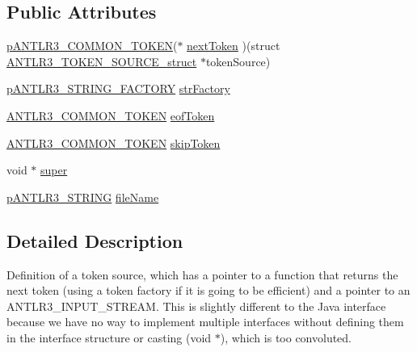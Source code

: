 \subsection*{Public Attributes}
\begin{DoxyCompactItemize}
\item 
\hyperlink{antlr3interfaces_8h_adaa6df9cbf0cd7ab37fd545520ff299b}{p\-A\-N\-T\-L\-R3\-\_\-\-C\-O\-M\-M\-O\-N\-\_\-\-T\-O\-K\-E\-N}($\ast$ \hyperlink{struct_a_n_t_l_r3___t_o_k_e_n___s_o_u_r_c_e__struct_ac1e745731ff025ccd806f6becfb4c4ea}{next\-Token} )(struct \hyperlink{struct_a_n_t_l_r3___t_o_k_e_n___s_o_u_r_c_e__struct}{A\-N\-T\-L\-R3\-\_\-\-T\-O\-K\-E\-N\-\_\-\-S\-O\-U\-R\-C\-E\-\_\-struct} $\ast$token\-Source)
\item 
\hyperlink{antlr3interfaces_8h_a499a87287d582de04cf736f342b20692}{p\-A\-N\-T\-L\-R3\-\_\-\-S\-T\-R\-I\-N\-G\-\_\-\-F\-A\-C\-T\-O\-R\-Y} \hyperlink{struct_a_n_t_l_r3___t_o_k_e_n___s_o_u_r_c_e__struct_ab65d5aa5431af0423d02ee9777417bd9}{str\-Factory}
\item 
\hyperlink{antlr3commontoken_8h_ab35c5fc3921ac6bfa1dbb31681aa9a0f}{A\-N\-T\-L\-R3\-\_\-\-C\-O\-M\-M\-O\-N\-\_\-\-T\-O\-K\-E\-N} \hyperlink{struct_a_n_t_l_r3___t_o_k_e_n___s_o_u_r_c_e__struct_a40b1631371c9aa2872f411c691d7348e}{eof\-Token}
\item 
\hyperlink{antlr3commontoken_8h_ab35c5fc3921ac6bfa1dbb31681aa9a0f}{A\-N\-T\-L\-R3\-\_\-\-C\-O\-M\-M\-O\-N\-\_\-\-T\-O\-K\-E\-N} \hyperlink{struct_a_n_t_l_r3___t_o_k_e_n___s_o_u_r_c_e__struct_a417f3d7f340e55046200a8dc20bdf5bd}{skip\-Token}
\item 
void $\ast$ \hyperlink{struct_a_n_t_l_r3___t_o_k_e_n___s_o_u_r_c_e__struct_a8ea66f6d566682d41b763ff27f6a0916}{super}
\item 
\hyperlink{antlr3interfaces_8h_a36bbe7362079348864db4b4dbdcce56b}{p\-A\-N\-T\-L\-R3\-\_\-\-S\-T\-R\-I\-N\-G} \hyperlink{struct_a_n_t_l_r3___t_o_k_e_n___s_o_u_r_c_e__struct_ac71607f39f82e74a177e44bcada52343}{file\-Name}
\end{DoxyCompactItemize}


\subsection{Detailed Description}
Definition of a token source, which has a pointer to a function that returns the next token (using a token factory if it is going to be efficient) and a pointer to an A\-N\-T\-L\-R3\-\_\-\-I\-N\-P\-U\-T\-\_\-\-S\-T\-R\-E\-A\-M. This is slightly different to the Java interface because we have no way to implement multiple interfaces without defining them in the interface structure or casting (void $\ast$), which is too convoluted. 

